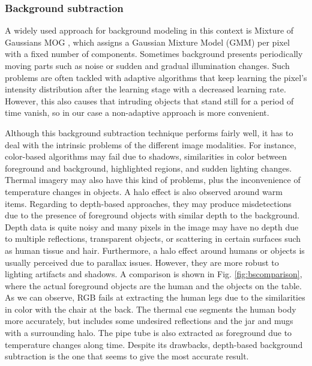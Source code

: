 \documentclass[10pt,twocolumn,letterpaper]{article}
\begin{document}
\subsubsection{Background subtraction}
\label{sect:bs}
 A widely used approach for background modeling in this context is Mixture of Gaussians MOG  \cite{bouwmans2008background}, which assigns a Gaussian Mixture Model (GMM) per pixel with a fixed number of components. Sometimes background presents periodically moving parts such as noise or sudden and gradual illumination changes. Such problems are often tackled with adaptive algorithms that keep learning the pixel's intensity distribution after the learning stage with a decreased learning rate. However, this also causes that intruding objects that stand still for a period of time vanish, so in our case a non-adaptive approach is more convenient.

Although this background subtraction technique performs fairly well, it has to deal with the intrinsic problems of the different image modalities. For instance, color-based algorithms may fail due to shadows, similarities in color between foreground and background, highlighted regions, and sudden lighting changes. Thermal imagery may also have this kind of problems, plus the inconvenience of temperature changes in objects. A halo effect is also observed around warm items. Regarding to depth-based approaches, they may produce misdetections due to the presence of foreground objects with similar depth to the background. Depth data is quite noisy and many pixels in the image may have no depth due to multiple reflections, transparent objects, or scattering in certain surfaces such as human tissue and hair. Furthermore, a halo effect around humans or objects is usually perceived due to parallax issues. However, they are more robust to lighting artifacts and shadows. A comparison is shown in Fig. \ref{fig:bscomparison}, where the actual foreground objects are the human and the objects on the table. As we can observe, RGB fails at extracting the human legs due to the similarities in color with the chair at the back. The thermal cue segments the human body more accurately, but includes some undesired reflections and the jar and mugs with a surrounding halo. The pipe tube is also extracted as foreground due to temperature changes along time. Despite its drawbacks, depth-based background subtraction is the one that seems to give the most accurate result. 
\end{document}
